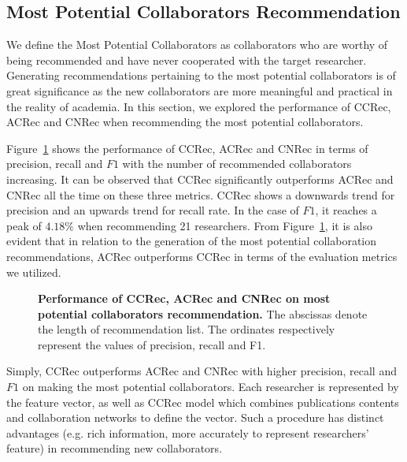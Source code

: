 \documentclass[10pt,letterpaper]{article}
\begin{document}
\subsection*{Most Potential Collaborators Recommendation}
We define the Most Potential Collaborators as collaborators who are worthy of being recommended and have never cooperated with the target researcher. Generating recommendations pertaining to the most potential collaborators is of great significance as the new collaborators are more meaningful and practical in the reality of academia. In this section, we explored the performance of CCRec, ACRec and CNRec when recommending the most potential collaborators.

Figure~\ref{Fig. 4} shows the performance of CCRec, ACRec and CNRec in terms of precision, recall and $F1$ with the number of recommended collaborators increasing. It can be observed that CCRec significantly outperforms ACRec and CNRec all the time on these three metrics. CCRec shows a downwards trend for precision and an upwards trend for recall rate. In the case of $F1$, it reaches a peak of $4.18\%$ when recommending 21 researchers. From Figure~\ref{Fig. 4}, it is also evident that in relation to the generation of the most potential collaboration recommendations, ACRec outperforms CCRec in terms of the evaluation metrics we utilized.

\begin{figure}[!hbt]
\caption{{\bf Performance of CCRec, ACRec and CNRec on most potential collaborators recommendation.} The abscissas denote the length of recommendation list. The ordinates respectively represent the values of precision, recall and F1.}
\label{Fig. 4}
\end{figure}

Simply, CCRec outperforms ACRec and CNRec with higher precision, recall and $F1$ on making the most potential collaborators. Each researcher is represented by the feature vector, as well as CCRec model which combines publications contents and collaboration networks to define the vector. Such a procedure has distinct advantages (e.g. rich information, more accurately to represent researchers' feature) in recommending new collaborators.
\end{document}
